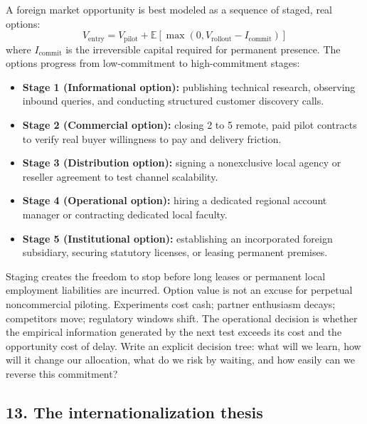 A foreign market opportunity is best modeled as a sequence of staged, real options:
\begin{equation}
V_{\text{entry}} = V_{\text{pilot}} + \mathbb{E}\left[\max(0, V_{\text{rollout}} - I_{\text{commit}})\right]
\end{equation}
where $I_{\text{commit}}$ is the irreversible capital required for permanent presence. The options progress from low-commitment to high-commitment stages:
\begin{itemize}
    \item \textbf{Stage 1 (Informational option):} publishing technical research, observing inbound queries, and conducting structured customer discovery calls.
    \item \textbf{Stage 2 (Commercial option):} closing 2 to 5 remote, paid pilot contracts to verify real buyer willingness to pay and delivery friction.
    \item \textbf{Stage 3 (Distribution option):} signing a nonexclusive local agency or reseller agreement to test channel scalability.
    \item \textbf{Stage 4 (Operational option):} hiring a dedicated regional account manager or contracting dedicated local faculty.
    \item \textbf{Stage 5 (Institutional option):} establishing an incorporated foreign subsidiary, securing statutory licenses, or leasing permanent premises.
\end{itemize}

Staging creates the freedom to stop before long leases or permanent local employment liabilities are incurred. Option value is not an excuse for perpetual noncommercial piloting. Experiments cost cash; partner enthusiasm decays; competitors move; regulatory windows shift. The operational decision is whether the empirical information generated by the next test exceeds its cost and the opportunity cost of delay. Write an explicit decision tree: what will we learn, how will it change our allocation, what do we risk by waiting, and how easily can we reverse this commitment?

\subsection{13. The internationalization thesis}

